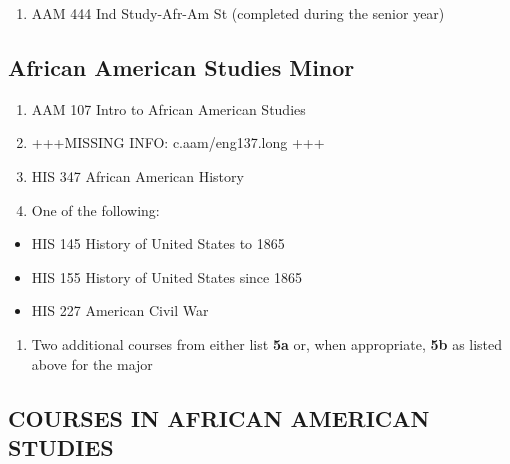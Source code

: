 \documentclass[
  letterpaper,
]{scrbook}
\providecommand{\tightlist}{%
  \setlength{\itemsep}{0pt}\setlength{\parskip}{0pt}}
\begin{document}
\begin{enumerate}
\def\labelenumi{\arabic{enumi}.}
\setcounter{enumi}{5}
\tightlist
\item
  AAM 444 Ind Study-Afr-Am St (completed during the senior year)
\end{enumerate}

\hypertarget{african-american-studies-minor}{%
\subsection{African American Studies
Minor}\label{african-american-studies-minor}}

\begin{enumerate}
\def\labelenumi{\arabic{enumi}.}
\tightlist
\item
  AAM 107 Intro to African American Studies\\
\item
  +++MISSING INFO: c.aam/eng137.long +++
\item
  HIS 347 African American History\\
\item
  One of the following:
\end{enumerate}

\begin{itemize}
\tightlist
\item
  HIS 145 History of United States to 1865
\item
  HIS 155 History of United States since 1865
\item
  HIS 227 American Civil War
\end{itemize}

\begin{enumerate}
\def\labelenumi{\arabic{enumi}.}
\setcounter{enumi}{4}
\tightlist
\item
  Two additional courses from either list \textbf{5a} or, when
  appropriate, \textbf{5b} as listed above for the major
\end{enumerate}

\hypertarget{courses-in-african-american-studies}{%
\subsection{COURSES IN AFRICAN AMERICAN
STUDIES}\label{courses-in-african-american-studies}}
\end{document}
